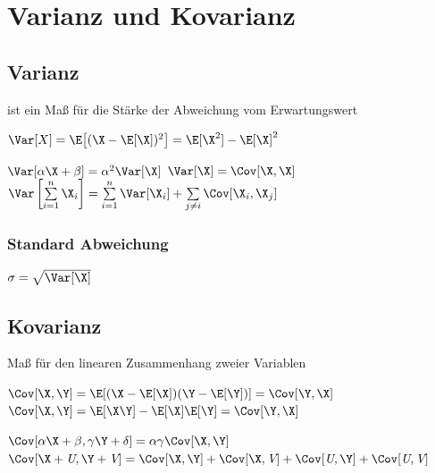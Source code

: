 \documentclass[german,color,6pt]{latex4ei/latex4ei_sheet}
\begin{document}

\vfill

\section{Varianz und Kovarianz}
\begin{sectionbox}
\subsection{Varianz}
	ist ein Maß für die Stärke der Abweichung vom Erwartungswert
	\begin{emphbox}
		$\Var [X] = \E \big[(\X - \E[\X])^2\big] = \E[\X^2] - \E[\X]^2$
	\end{emphbox}
	$\Var [ \alpha \X + \beta] = \alpha^2 \Var [\X]$ \hfill $\Var [\X] = \Cov [\X,\X]$\\[0.5em]
	$\Var \left[\sum \limits_{i=1}^n \X_i \right] = \sum \limits_{i=1}^{n} \Var [\X_i] + \sum\limits_{j \not= i} \Cov[\X_i, \X_j]$
	\subsubsection{Standard Abweichung}
	$\sigma = \sqrt{\Var[\X]}$
\end{sectionbox}

\begin{sectionbox}
\subsection{Kovarianz}
	Maß für den linearen Zusammenhang zweier Variablen
	\begin{emphbox}
		$\Cov [\X,\Y] = \E[(\X- \E[\X])(\Y - \E[\Y])] = \Cov [\Y, \X]$\\[0.5em]
		$\Cov [\X,\Y] = \E [\X\Y] - \E[\X] \E[\Y] = \Cov[\Y, \X]$
	\end{emphbox}
	$\Cov [\alpha \X + \beta, \gamma \Y + \delta] = \alpha \gamma \Cov [\X, \Y]$ \\
	$\Cov [ \X + \textit U, \Y + \textit V] = \Cov [\X, \Y] + \Cov [\X, \textit V] + \Cov [\textit U, \Y] + \Cov [\textit U, \textit V]$ \\
\end{sectionbox}
\end{document}
